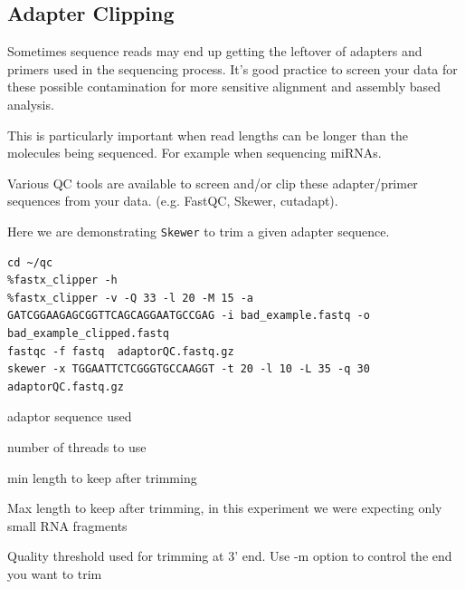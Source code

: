 \begin{advanced}
\subsection{Adapter Clipping}
Sometimes sequence reads may end up getting the leftover of adapters and primers
used in the sequencing process. It's good practice to screen your data for
these possible contamination for more sensitive alignment and assembly based
analysis.

\begin{note}
This is particularly important when read lengths can be longer than the
molecules being sequenced. For example when sequencing miRNAs.
\end{note}

Various QC tools are available to screen and/or clip these adapter/primer
sequences from your data. (e.g. FastQC, Skewer, cutadapt).

\begin{steps}
Here we are demonstrating \texttt{Skewer} to trim a given adapter
sequence.

\begin{lstlisting}
cd ~/qc
%fastx_clipper -h
%fastx_clipper -v -Q 33 -l 20 -M 15 -a GATCGGAAGAGCGGTTCAGCAGGAATGCCGAG -i bad_example.fastq -o bad_example_clipped.fastq
fastqc -f fastq  adaptorQC.fastq.gz
skewer -x TGGAATTCTCGGGTGCCAAGGT -t 20 -l 10 -L 35 -q 30 adaptorQC.fastq.gz

\end{lstlisting}
\end{steps}

\begin{note}
\begin{description}[style=multiline,labelindent=0cm,align=right,leftmargin=\descriptionlabelspace,rightmargin=1.5cm,font=\ttfamily]
     \item[-x TGGAATTCTCGGGTGCCAAGGT] adaptor sequence used
      \item[-t] number of threads to use
     \item[-l] min length to keep after trimming
     \item[-L] Max length to keep after trimming, in this experiment we were expecting only small RNA fragments
     \item[-Q] Quality threshold used for trimming at 3' end. Use -m option to control the end you want to trim
\end{description}
\end{note}



\end{advanced}
